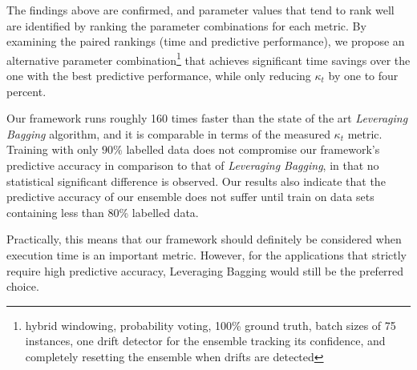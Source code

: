 The findings above are confirmed, and parameter values that tend to rank well are identified by ranking the parameter combinations for each metric. By examining the paired rankings (time and predictive performance), we propose an alternative parameter combination\footnote{hybrid windowing, probability voting, 100\% ground truth, batch sizes of 75 instances, one drift detector for the ensemble tracking its confidence, and completely resetting the ensemble when drifts are detected} that achieves significant time savings over the one with the best predictive performance, while only reducing $\kappa_t$ by one to four percent.

Our framework runs roughly 160 times faster than the state of the art \textit{Leveraging Bagging} algorithm, and it is comparable in terms of the measured $\kappa_t$ metric. Training with only $90\%$ labelled data does not compromise our framework's predictive accuracy in comparison to that of \textit{Leveraging Bagging}, in that no statistical significant difference is observed. Our results also indicate that the predictive accuracy of our ensemble does not suffer until train on data sets containing less than 80\% labelled data.

Practically, this means that our framework should definitely be considered when execution time is an important metric. However, for the applications that strictly require high predictive accuracy, Leveraging Bagging would still be the preferred choice.